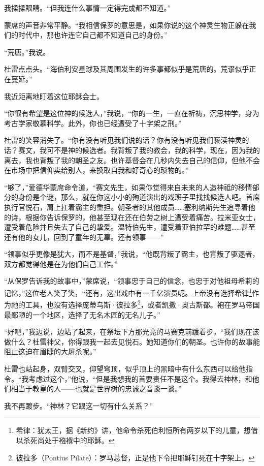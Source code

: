 \documentclass[AutoFakeBold=true]{book}
\begin{document}
我揉揉眼睛。``但我连什么事情一定得完成都不知道。''

蒙席的声音非常平静。``我相信保罗的意思是，如果你说的这个神灵生物正躲在我们的时代中，那也许连它自己都不知道自己的身份。''

``荒唐。''我说。

杜雷点点头。``海伯利安星球及其周围发生的许多事都似乎是荒唐的。荒谬似乎正在蔓延。''

我近距离地盯着这位耶稣会士。

``你很有希望是这位神的候选人，''我说，``你的一生，一直在祈祷，沉思神学，身为考古学家敬慕科学。此外，你也已经遭受了十字架之刑。''

杜雷的笑容消失了。``你有没有听见我们说的话？你有没有听见我们亵渎神灵的话？赛文，我可不是神的候选者。我背叛了我的教会，我的科学，现在，因为我的离去，我也背叛了我的朝圣之友。也许基督会在几秒内失去自己的信仰，但他不会在市场中把信仰卖给别人，来换取自我和好奇心的琐物的。''

``够了，''爱德华蒙席命令道，``赛文先生，如果你觉得来自未来的人造神祗的移情部分的身份是个谜，那么，就在你这小小的殉道演出的戏班子里找找候选人吧。首席执行官悦石，肩上扛着霸主的重担。朝圣者的其他成员……塞利纳斯先生追寻着他的诗，根据你告诉保罗的，他甚至现在还在伯劳之树上遭受着痛苦。拉米亚女士，遭受着危险并且失去了自己的挚爱。温特伯先生，遭受着亚伯拉罕的难题……甚至还有他的女儿，回到了童年的无辜。还有领事——''

``领事似乎更像是犹大，而不是基督，''我说，``他既背叛了霸主，也背叛了驱逐者，双方都觉得他是在为他们自己工作。''

``从保罗告诉我的故事中，''蒙席说，``领事忠于自己的信念，也忠于对他祖母希莉的记忆，''这位老人笑了笑，``还有，这出戏中有一千亿演员呢。上帝没有选择希律\footnote{希律：犹太王，据《新约》讲，他命令杀死伯利恒所有两岁以下的儿童，想借以杀死尚处于襁褓中的耶稣。}作为祂的工具，也没有选择庞蒂乌斯·彼拉多\footnote{彼拉多（Pontius Pilate）：罗马总督，正是他下令把耶稣钉死在十字架上。}，或者凯撒·奥古斯都。袍在罗马帝国最鄙陋的一个地区，选择了无名木匠的无名儿子。''

``好吧，''我边说，边站了起来，在祭坛下方那光亮的马赛克前踱着步，``我们现在该做什么？杜雷神父，你得跟我一起去见悦石。她知道你们的朝圣。也许你的故事能阻止这迫在眉睫的大屠杀呢。''

杜雷也站起身，双臂交叉，仰望穹顶，似乎顶上的黑暗中有什么东西可以给他指令。``我考虑过这个，''他说，``但是我想我的首要责任不是这个。我得去神林，和他们相当于教皇的人——也就是世界树的忠诚之音谈一谈。''

我不再踱步。``神林？它跟这一切有什么关系？''
\end{document}
